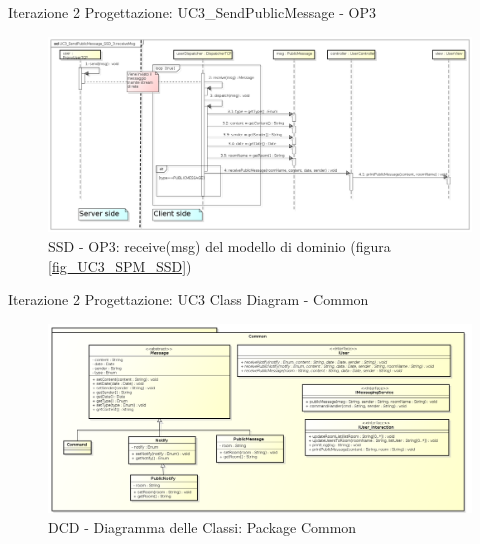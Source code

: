 \documentclass[t]{beamer} %
\begin{document}
\begin{frame} {Iterazione 2 Progettazione: UC3\_SendPublicMessage - OP3}
   \begin{figure}
     \includegraphics[scale=0.23]{image_astah/Iteration_2_DesignModel/UC3_SendPublicMessage_SSD_3_receiveMsg.png}{\centering}
     \caption{SSD - OP3: receive(msg) del modello di dominio (figura \ref{fig_UC3_SPM_SSD})}
     \label{fig_UC3_SSD_SRM_3} 
   \end{figure}
\end{frame}

\begin{frame} {Iterazione 2 Progettazione: UC3 Class Diagram - Common}
   \begin{figure}
     \includegraphics[scale=0.245]{image_astah/Iteration_2_DesignModel/ClassDiagramCommon.png}{\centering}
     \caption{DCD - Diagramma delle Classi: Package Common }
     \label{fig_UC3_DCD_1} 
   \end{figure}
\end{frame}
\end{document}
